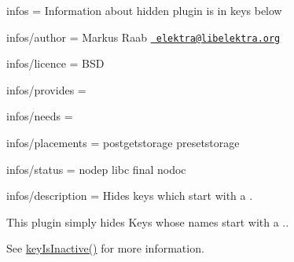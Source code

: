 
\begin{DoxyItemize}
\item infos = Information about hidden plugin is in keys below
\item infos/author = Markus Raab \href{mailto:elektra@libelektra.org}{\texttt{ elektra@libelektra.\+org}}
\item infos/licence = B\+SD
\item infos/provides =
\item infos/needs =
\item infos/placements = postgetstorage presetstorage
\item infos/status = nodep libc final nodoc
\item infos/description = Hides keys which start with a .
\end{DoxyItemize}

This plugin simply hides Keys whose names start with a {\ttfamily .}.

See {\ttfamily \mbox{\hyperlink{group__keytest_gaa25f699f592031c1a0abc1504d14e13e}{key\+Is\+Inactive()}}} for more information. 
